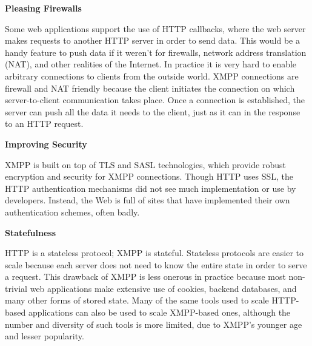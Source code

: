       \textbf{Pleasing Firewalls}

      Some web applications support the use of HTTP callbacks, where the web server makes requests to another HTTP server in order to send data. This would be a handy feature to push data if it weren’t for firewalls, network address translation (NAT), and other realities of the Internet. In practice it is very hard to enable arbitrary connections to clients from the outside world. XMPP connections are firewall and NAT friendly because the client initiates the connection on which server-to-client communication takes place. Once a connection is established, the server can push all the data it needs to the client, just as it can in the response to an HTTP request.
      
      \textbf{Improving Security}

      XMPP is built on top of TLS and SASL technologies, which provide robust encryption and security for XMPP connections. Though HTTP uses SSL, the HTTP authentication mechanisms did not see much implementation or use by developers. Instead, the Web is full of sites that have implemented their own authentication schemes, often badly.
      
      \textbf{Statefulness}

      HTTP is a stateless protocol; XMPP is stateful. Stateless protocols are easier to scale because each server does not need to know the entire state in order to serve a request. This drawback of XMPP is less onerous in practice because most non-trivial web applications make extensive use of cookies, backend databases, and many other forms of stored state. Many of the same tools used to scale HTTP-based applications can also be used to scale XMPP-based ones, although the number and diversity of such tools is more limited, due to XMPP’s younger age and lesser popularity.

